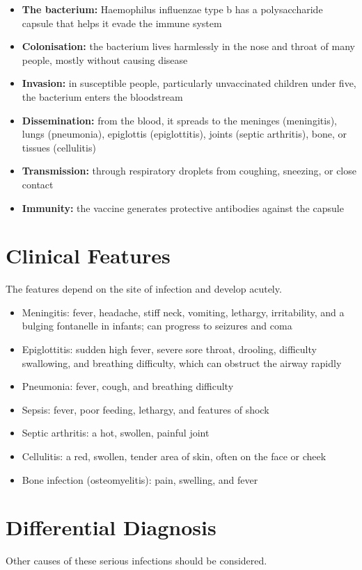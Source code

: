 \begin{itemize}
    \item \textbf{The bacterium:} Haemophilus influenzae type b has a polysaccharide capsule that helps it evade the immune system
    \item \textbf{Colonisation:} the bacterium lives harmlessly in the nose and throat of many people, mostly without causing disease
    \item \textbf{Invasion:} in susceptible people, particularly unvaccinated children under five, the bacterium enters the bloodstream
    \item \textbf{Dissemination:} from the blood, it spreads to the meninges (meningitis), lungs (pneumonia), epiglottis (epiglottitis), joints (septic arthritis), bone, or tissues (cellulitis)
    \item \textbf{Transmission:} through respiratory droplets from coughing, sneezing, or close contact
    \item \textbf{Immunity:} the vaccine generates protective antibodies against the capsule
\end{itemize}

\section*{Clinical Features}
The features depend on the site of infection and develop acutely.

\begin{itemize}
    \item Meningitis: fever, headache, stiff neck, vomiting, lethargy, irritability, and a bulging fontanelle in infants; can progress to seizures and coma
    \item Epiglottitis: sudden high fever, severe sore throat, drooling, difficulty swallowing, and breathing difficulty, which can obstruct the airway rapidly
    \item Pneumonia: fever, cough, and breathing difficulty
    \item Sepsis: fever, poor feeding, lethargy, and features of shock
    \item Septic arthritis: a hot, swollen, painful joint
    \item Cellulitis: a red, swollen, tender area of skin, often on the face or cheek
    \item Bone infection (osteomyelitis): pain, swelling, and fever
\end{itemize}

\section*{Differential Diagnosis}
Other causes of these serious infections should be considered.

